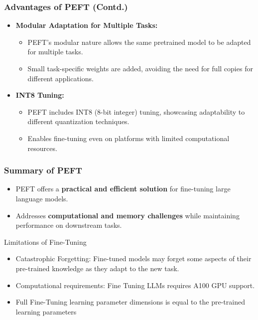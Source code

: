 \begin{frame}[fragile]\frametitle{Advantages of PEFT (Contd.)}
  \begin{itemize}
    \item \textbf{Modular Adaptation for Multiple Tasks:}
      \begin{itemize}
        \item PEFT's modular nature allows the same pretrained model to be adapted for multiple tasks.
        \item Small task-specific weights are added, avoiding the need for full copies for different applications.
      \end{itemize}
    \item \textbf{INT8 Tuning:}
      \begin{itemize}
        \item PEFT includes INT8 (8-bit integer) tuning, showcasing adaptability to different quantization techniques.
        \item Enables fine-tuning even on platforms with limited computational resources.
      \end{itemize}
  \end{itemize}
\end{frame}

\begin{frame}[fragile]\frametitle{Summary of PEFT}
  \begin{itemize}
    \item PEFT offers a \textbf{practical and efficient solution} for fine-tuning large language models.
    \item Addresses \textbf{computational and memory challenges} while maintaining performance on downstream tasks.
  \end{itemize}
\end{frame}

\begin{frame}[fragile]{Limitations of Fine-Tuning}
    \begin{itemize}
        \item Catastrophic Forgetting: Fine-tuned models may forget some aspects of their pre-trained knowledge as they adapt to the new task.
        \item Computational requirements: Fine Tuning LLMs requires A100 GPU support.
        \item Full Fine-Tuning learning parameter dimensions is equal to the pre-trained learning parameters
    \end{itemize}
\end{frame}

